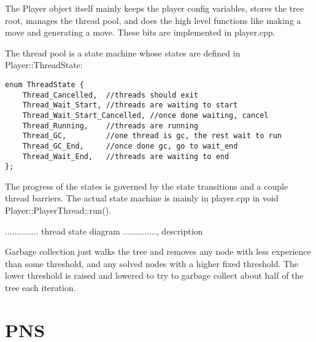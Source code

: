\documentclass[12pt]{article}          %
\begin{document}
The Player object itself mainly keeps the player config variables, stores the tree root, manages the thread pool, and does the high level functions like making a move and generating a move. These bits are implemented in player.cpp.

The thread pool is a state machine whose states are defined in Player::ThreadState:
\begin{lstlisting}
enum ThreadState {
	Thread_Cancelled,  //threads should exit
	Thread_Wait_Start, //threads are waiting to start
	Thread_Wait_Start_Cancelled, //once done waiting, cancel
	Thread_Running,    //threads are running
	Thread_GC,         //one thread is gc, the rest wait to run
	Thread_GC_End,     //once done gc, go to wait_end
	Thread_Wait_End,   //threads are waiting to end
};
\end{lstlisting}

The progress of the states is governed by the state transitions and a couple thread barriers. The actual state machine is mainly in player.cpp in void Player::PlayerThread::run().

.............. thread state diagram .............., description


Garbage collection just walks the tree and removes any node with less experience than some threshold, and any solved nodes with a higher fixed threshold. The lower threshold is raised and lowered to try to garbage collect about half of the tree each iteration.



\section{PNS}
\end{document}
